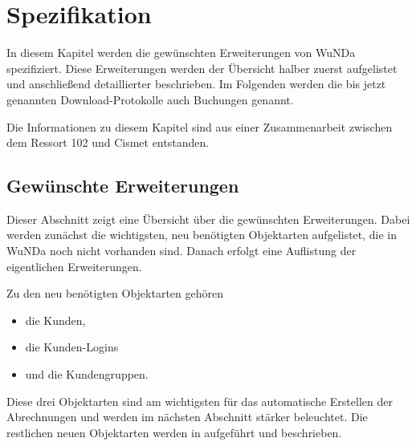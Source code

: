 \chapter{Spezifikation}
In diesem Kapitel werden die gewünschten Erweiterungen von \ac{WuNDa} spezifiziert.
Diese Erweiterungen werden der Übersicht halber zuerst aufgelistet und anschließend detaillierter beschrieben.
Im Folgenden werden die bis jetzt genannten Download-Protokolle auch Buchungen genannt. 

Die Informationen zu diesem Kapitel sind aus einer Zusammenarbeit zwischen dem Ressort 102 und Cismet entstanden. 
\section{Gewünschte Erweiterungen}
Dieser Abschnitt zeigt eine Übersicht über die gewünschten Erweiterungen. Dabei werden zunächst die wichtigsten, neu benötigten Objektarten aufgelistet, die in \ac{WuNDa} noch nicht  vorhanden sind. Danach erfolgt eine Auflistung der eigentlichen Erweiterungen.

Zu den neu benötigten Objektarten gehören
\begin{itemize}
\item die Kunden,
\item die Kunden-Logins
\item und die Kundengruppen.
\end{itemize}
Diese drei Objektarten sind am wichtigsten für das automatische Erstellen der Abrechnungen und werden im nächsten Abschnitt stärker beleuchtet.
Die restlichen neuen Objektarten werden in  aufgeführt und beschrieben. 

